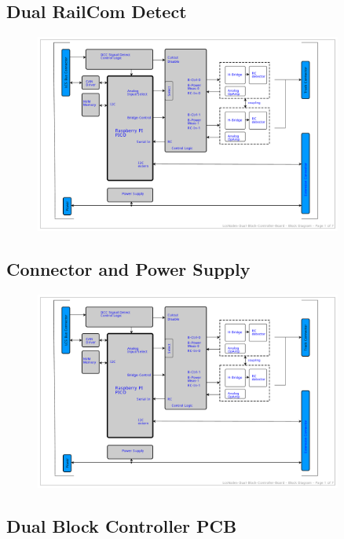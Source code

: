 \subsection{Dual RailCom Detect}

\begin{figure}[htbp]
    \centering
    \includegraphics[page=6, width=0.9\textwidth]{./Schematics/Schematic_LcsNodes-Dual-Block-Controller.pdf}
\end{figure}
\FloatBarrier

\subsection{Connector and Power Supply}

\begin{figure}[htbp]
    \centering
    \includegraphics[page=7, width=0.9\textwidth]{./Schematics/Schematic_LcsNodes-Dual-Block-Controller.pdf}
\end{figure}
\FloatBarrier

\subsection{Dual Block Controller PCB}

